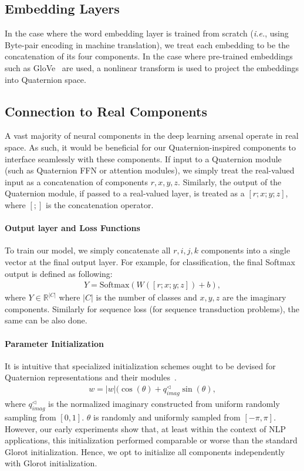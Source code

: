 \documentclass[11pt,a4paper]{article}
\begin{document}
\subsection{Embedding Layers}
In the case where the word embedding layer is trained from scratch (\emph{i.e.}, using Byte-pair encoding in machine translation), we treat each embedding to be the concatenation of its four components. In the case where pre-trained embeddings such as GloVe~\cite{pennington2014glove} are used, a nonlinear transform is used to project the embeddings into Quaternion space.

\subsection{Connection to Real Components}
A vast majority of neural components in the deep learning arsenal operate in real space. As such, it would be beneficial for our Quaternion-inspired components to interface seamlessly with these components. If input to a Quaternion module (such as Quaternion FFN or attention modules), we simply treat the real-valued input as a concatenation of components $r,x,y,z$. Similarly, the output of the Quaternion module, if passed to a real-valued layer, is treated as a $[r;x;y;z]$, where $[;]$ is the concatenation operator.
\paragraph{Output layer and Loss Functions}
To train our model, we simply concatenate all $r,i,j,k$ components into a single vector at the final output layer. For example, for classification, the final Softmax output is defined as following:
\begin{align*}
Y = \text{Softmax}(W([r;x;y;z]) + b),
\end{align*}
where $Y \in \mathbb{R}^{|C|}$ where $|C|$ is the number of classes and $x,y,z$ are the imaginary components. Similarly for sequence loss (for sequence transduction problems), the same can be also done.
\paragraph{Parameter Initialization} It is intuitive that specialized initialization schemes ought to  be devised for Quaternion representations and their modules~\cite{parcollet2018quaternion,parcollet2018quaternion2}.
\begin{align*}
w = |w|(\cos(\theta) + q^{\triangleleft}_{imag} \sin(\theta),
\end{align*}
where $q^{\triangleleft}_{imag}$ is the normalized imaginary constructed from uniform randomly sampling from $[0,1]$. $\theta$ is randomly and uniformly sampled from $[-\pi,\pi]$. However, our early experiments show that, at least within the context of NLP applications, this initialization performed comparable or worse than the standard Glorot initialization. Hence, we opt to initialize all components independently with Glorot initialization.
\end{document}
